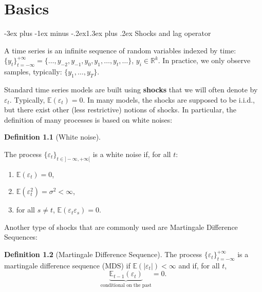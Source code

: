 \documentclass[
  11pt,
]{book}
\makeatletter
\providecommand{\tightlist}{%
  \setlength{\itemsep}{0pt}\setlength{\parskip}{0pt}}
\renewcommand\section{\@startsection{section}{1}{\z@}
  {-3ex plus -1ex minus -.2ex}{1.3ex plus .2ex}
  {\normalfont\Large\bfseries\color{TextbookInk}}}
\theoremstyle{definition}
\newtheorem{definition}{Definition}[chapter]
\theoremstyle{definition}
\theoremstyle{definition}
\theoremstyle{definition}
\theoremstyle{remark}
\makeatother
\begin{document}
\chapter{Basics}\label{Intro}

\section{Shocks and lag operator}\label{shocks-and-lag-operator}

A time series is an infinite sequence of random variables indexed by time: \(\{y_t\}_{t=-\infty}^{+\infty}=\{\dots, y_{-2},y_{-1},y_{0},y_{1},\dots,y_t,\dots\}\), \(y_i \in \mathbb{R}^k\). In practice, we only observe samples, typically: \(\{y_{1},\dots,y_T\}\).

Standard time series models are built using \textbf{shocks} that we will often denote by \(\varepsilon_t\). Typically, \(\mathbb{E}(\varepsilon_t)=0\). In many models, the shocks are supposed to be i.i.d., but there exist other (less restrictive) notions of shocks. In particular, the definition of many processes is based on white noises:

\begin{definition}[White noise]
\protect\hypertarget{def:whitenoise}{}\label{def:whitenoise}

The process \(\{\varepsilon_t\}_{t \in] -\infty,+\infty[}\) is a white noise if, for all \(t\):

\begin{enumerate}
\def\labelenumi{\alph{enumi}.}
\tightlist
\item
  \(\mathbb{E}(\varepsilon_t)=0\),
\item
  \(\mathbb{E}(\varepsilon_t^2)=\sigma^2<\infty\),
\item
  for all \(s\ne t\), \(\mathbb{E}(\varepsilon_t \varepsilon_s)=0\).
\end{enumerate}

\end{definition}

Another type of shocks that are commonly used are Martingale Difference Sequences:

\begin{definition}[Martingale Difference Sequence]
\protect\hypertarget{def:MDS}{}\label{def:MDS}The process \(\{\varepsilon_t\}_{t = -\infty}^{+\infty}\) is a martingale difference sequence (MDS) if \(\mathbb{E}(|\varepsilon_{t}|)<\infty\) and if, for all \(t\),
\[
\underbrace{\mathbb{E}_{t-1}(\varepsilon_{t})}_{\mbox{conditional on the past}}=0.
\]
\end{definition}
\end{document}
